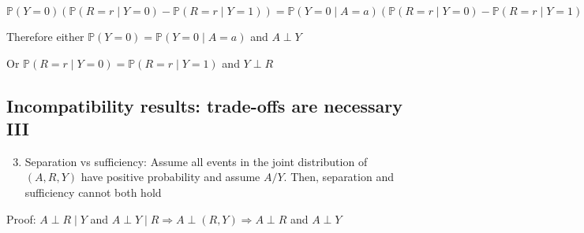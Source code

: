 $
\mathbb{P}(Y=0)(\mathbb{P}(R=r \mid Y=0)-\mathbb{P}(R=r \mid Y=1))
=\mathbb{P}(Y=0 \mid A=a)(\mathbb{P}(R=r \mid Y=0)-\mathbb{P}(R=r \mid Y=1))
$

Therefore either $\mathbb{P}(Y=0)=\mathbb{P}(Y=0 \mid A=a)$ and $A \perp Y$

Or $\mathbb{P}(R=r \mid Y=0)=\mathbb{P}(R=r \mid Y=1)$ and $Y \perp R$

\subsection*{Incompatibility results: trade-offs are necessary III}
\begin{enumerate}
  \setcounter{enumi}{2}
  \item Separation vs sufficiency: Assume all events in the joint distribution of $(A, R, Y)$ have positive probability and assume $A / Y$. Then, separation and sufficiency cannot both hold 
\end{enumerate}

Proof:
$A \perp R \mid Y$ and $A \perp Y \mid R \Longrightarrow A \perp(R, Y) \Longrightarrow A \perp R$ and $A \perp Y$

